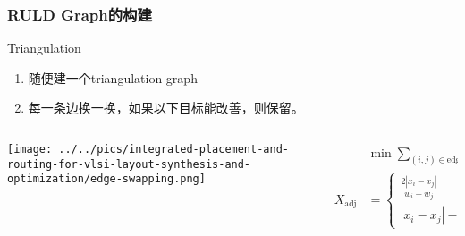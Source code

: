 \documentclass[UTF8,lualatex]{ctexbeamer}
\newcommand{\edges}{\text{edges}}
\begin{document}

\begin{frame}
    \frametitle{RULD Graph的构建}
    
    \begin{block}{Triangulation}
        \begin{enumerate}
            \item 随便建一个triangulation graph
            \item 每一条边换一换，如果以下目标能改善，则保留。
        \end{enumerate}
        \begin{columns}
            \begin{column}{0.2\textwidth}
                \texttt{[image: ../../pics/integrated-placement-and-routing-for-vlsi-layout-synthesis-and-optimization/edge-swapping.png]}
            \end{column}
            \begin{column}{0.74\textwidth}
                \small
                \begin{align*}
                    &\min\sum_{(i,j)\in\edges} X_\text{adj}^2(i,j) + Y_\text{adj}^2(i,j)
                    \\
                    X_\text{adj}&=\begin{cases}
                        \frac{2\left|x_i-x_j\right|}{w_i+w_j}    &\text{if }\left|x_i-x_j\right|\leqslant\frac{w_i+w_j}{2}\\
                        \left|x_i-x_j\right|-\frac{w_i+w_j}{2}+1    &\text{otherwise}
                    \end{cases}
                \end{align*}
            \end{column}
        \end{columns}
    \end{block}
\end{frame}
\end{document}
